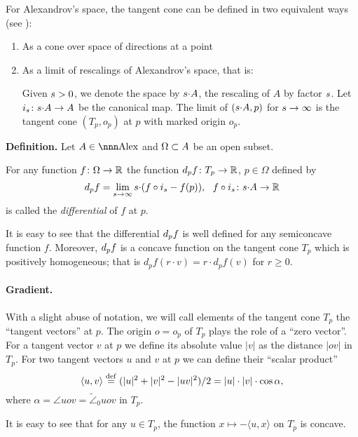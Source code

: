 \documentclass{article}
\begin{document}
For Alexandrov's space, the tangent cone can be defined in two equivalent ways (see \cite[7.8.1]{BGP}):
\begin{enumerate}[$\diamond$]
\item As a cone over space of directions at a point
\item \label{tangent-def2}
As a limit of rescalings of Alexandrov's space, that is:

Given $s>0$, we denote the space by $s{\cdot} A$, the rescaling of $A$ by factor $s$.
Let $i_s\colon s{\cdot} A\to A$ be the canonical map. 
The limit of $(s{\cdot} A,p)$ for $s\to\infty$ is  the tangent cone $(T_p,o_p)$ at $p$ with marked origin $o_p$. 

\end{enumerate}



\begin{thm}{\bf Definition.}\label{def:df} Let $A\in\Alex$ and $\Omega\subset A$ be an open subset.

For any function $f\colon\Omega \rightarrow \mathbb{R}$ the function $d_p f\colon T_p \rightarrow \mathbb{R}$, $p\in\Omega$ defined by
$$d_p f=\lim_{s\to\infty} s{\cdot}(f\circ i_s-f(p)), \ \ f\circ i_s\colon s{\cdot} A\to\mathbb{R}$$
is called the \emph{differential} of $f$ at $p$.
\end{thm}

It is easy to see that the differential $d_p f$ is well defined for any semiconcave function $f$. 
Moreover, $d_p f$
is a concave function on the tangent cone $T_p$ which is positively homogeneous; 
that is
$d_p f(r\cdot v)=r\cdot d_p f(v)$
for $r\ge0$.

\paragraph*{Gradient.} With a slight abuse of notation, we will call elements of the tangent cone $T_p$ the ``tangent vectors'' at $p$.
The origin $o=o_p$ of $T_p$ plays the role of a ``zero 
vector''.
For a tangent vector $v$ at $p$ we define its absolute value $|v|$ 
as the distance $|o v|$ in $T_p$.
For two tangent vectors $u$ and $v$ at $p$ we can define 
their ``scalar product'' 
$$\langle u, v\rangle\df
=
(|u|^2+|v|^2-|u v|^2)/2
=
|u|\cdot |v|\cdot\cos\alpha,$$ 
where $\alpha=\angle u o v=\tilde\angle_0 u o v$ in $T_p$.

 It is easy to see that for any $u\in T_p$, the function $x\mapsto -\langle u, x\rangle$ on $T_p$ is concave.
\end{document}
